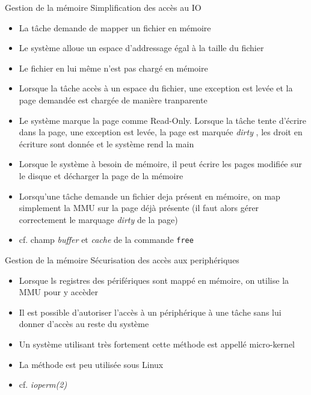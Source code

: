 \begin{frame}{Gestion de la mémoire}
  Simplification des accès au IO
  \begin{itemize} 
  \item La tâche demande de mapper un fichier en mémoire
  \item Le système  alloue un espace d'addressage égal  à la taille du
    fichier
  \item Le fichier en lui même n'est pas chargé en mémoire
  \item Lorsque la  tâche accès à un espace  du fichier, une exception
    est levée et la page demandée est chargée de manière tranparente
  \item Le  système marque la  page comme Read-Only. Lorsque  la tâche
    tente d'écrire dans la page,  une exception est levée, la page est
    marquée \emph{dirty}  , les  droit en écriture  sont donnée  et le
    système rend la main
  \item Lorsque  le système  à besoin de  mémoire, il peut  écrire les
    pages modifiée sur le disque et décharger la page de la mémoire
  \item Lorsqu'une  tâche demande un fichier deja  présent en mémoire,
    on map simplement la MMU sur  la page déjà présente (il faut alors
    gérer correctement le marquage \emph{dirty} de la page)
  \item  cf.   champ  \emph{buffer}  et \emph{cache}  de  la  commande
    \texttt{free}
  \end{itemize}
\end{frame}

\begin{frame}{Gestion de la mémoire}
  Sécurisation des accès aux periphériques
  \begin{itemize}
  \item Lorsque  ls registres des périfériques sont  mappé en mémoire,
    on utilise la MMU pour y accèder
  \item Il  est possible d'autoriser  l'accès à un périphérique  à une
    tâche sans lui donner d'accès au reste du système
  \item Un système utilisant  très fortement cette méthode est appellé
    micro-kernel
  \item La méthode est peu utilisée sous Linux
  \item cf. \emph{ioperm(2)}
  \end{itemize}
\end{frame}

